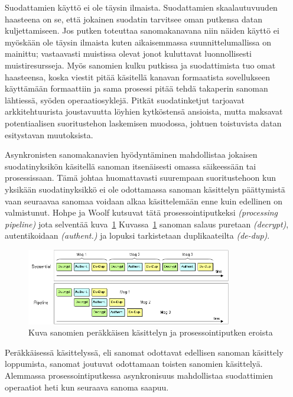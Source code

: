       Suodattamien käyttö ei ole täysin ilmaista. Suodattamien skaalautuvuuden haasteena on se, että jokainen suodatin tarvitsee oman putkensa datan kuljettamiseen. Jos putken toteuttaa sanomakanavana niin näiden käyttö ei myöskään ole täysin ilmaista kuten aikaisemmassa suunnittelumallissa on mainittu; vastaavasti muistissa olevat jonot kuluttavat luonnollisesti muistiresursseja. Myös sanomien kulku putkissa ja suodattimista tuo omat haasteensa, koska viestit pitää käsitellä kanavan formaatista sovellukseen käyttämään formaattiin ja sama prosessi pitää tehdä takaperin sanoman lähtiessä, syöden operaatiosyklejä. Pitkät suodatinketjut tarjoavat arkkitehtuurista joustavuutta löyhien kytköstensä ansioista, mutta maksavat potentiaalisen suoritustehon laskemisen muodossa, johtuen toistuvista datan esitystavan muutoksista.


      Asynkronisten sanomakanavien hyödyntäminen mahdollistaa jokaisen suodatinyksikön käsitellä sanoman itsenäisesti omassa säikeessään tai prosessissaan. Tämä johtaa huomattavasti suurempaan suoritustehoon kun yksikään suodatinyksikkö ei ole odottamassa sanoman käsittelyn päättymistä vaan seuraavaa sanomaa voidaan alkaa käsittelemään enne kuin edellinen on valmistunut.
         Hohpe ja Woolf kutsuvat tätä prosessointiputkeksi \textit{(processing pipeline)} jota selventää kuva~\ref{fig:pipelineprocess} \citep{Hohpe2004} \citep{EnterpriseIntegration} 
         Kuvassa~\ref{fig:pipelineprocess} sanoman salaus puretaan \textit{(decrypt)}, autentikoidaan \textit{(authent.)} ja lopuksi tarkistetaan duplikaateilta \textit{(de-dup)}.

      \begin{figure}[h]
      \begin{center}
      \includegraphics[width=0.8\textwidth]{kuvat/pipeline_processing.png}
      \caption{Kuva sanomien peräkkäisen käsittelyn ja prosessointiputken eroista \citep{Hohpe2004}\label{fig:pipelineprocess}}
      \end{center}
      \end{figure}

      Peräkkäisessä käsittelyssä, eli sanomat odottavat edellisen sanoman käsittely loppumista, sanomat joutuvat odottamaan toisten sanomien käsittelyä. Alemmassa prosessointiputkessa asynkronisuus mahdollistaa suodattimien operaatiot heti kun seuraava sanoma saapuu.
      
